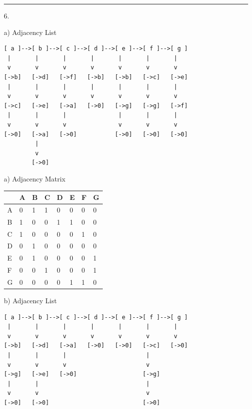 \documentclass{article}
\begin{document}
\noindent\rule{8cm}{0.4pt}

6. 

a) Adjacency List

\begin{lstlisting}
[ a ]-->[ b ]-->[ c ]-->[ d ]-->[ e ]-->[ f ]-->[ g ]
 |       |       |       |       |       |       | 
 v       v       v       v       v       v       v
[->b]   [->d]   [->f]   [->b]   [->b]   [->c]   [->e]
 |       |       |       |       |       |       | 
 v       v       v       v       v       v       v
[->c]   [->e]   [->a]   [->0]   [->g]   [->g]   [->f]
 |       |       |               |       |       | 
 v       v       v               v       v       v
[->0]   [->a]   [->0]           [->0]   [->0]   [->0]
         |
         v
        [->0] 
\end{lstlisting}


a) Adjacency Matrix

\begin{table}[H]
\begin{tabular}{l|l|l|l|l|l|l|l|}
\cline{2-8}
 & A & B & C & D & E & F & G \\ \hline
\multicolumn{1}{|l|}{A} & 0 & 1 & 1 & 0 & 0 & 0 & 0 \\ \hline
\multicolumn{1}{|l|}{B} & 1 & 0 & 0 & 1 & 1 & 0 & 0 \\ \hline
\multicolumn{1}{|l|}{C} & 1 & 0 & 0 & 0 & 0 & 1 & 0 \\ \hline
\multicolumn{1}{|l|}{D} & 0 & 1 & 0 & 0 & 0 & 0 & 0 \\ \hline
\multicolumn{1}{|l|}{E} & 0 & 1 & 0 & 0 & 0 & 0 & 1 \\ \hline
\multicolumn{1}{|l|}{F} & 0 & 0 & 1 & 0 & 0 & 0 & 1 \\ \hline
\multicolumn{1}{|l|}{G} & 0 & 0 & 0 & 0 & 1 & 1 & 0 \\ \hline
\end{tabular}
\end{table}


b) Adjacency List

\begin{lstlisting}
[ a ]-->[ b ]-->[ c ]-->[ d ]-->[ e ]-->[ f ]-->[ g ]
 |       |       |       |       |       |       | 
 v       v       v       v       v       v       v
[->b]   [->d]   [->a]   [->0]   [->0]   [->c]   [->0]
 |       |       |                       |     
 v       v       v                       v    
[->g]   [->e]   [->0]                   [->g]
 |       |                               |  
 v       v                               v   
[->0]   [->0]                           [->0]

\end{lstlisting}
\end{document}
